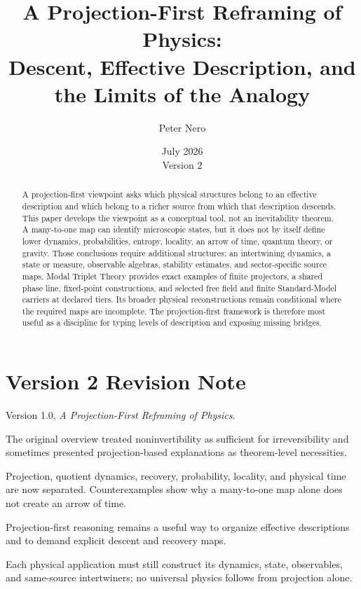 \documentclass[11pt]{article}
\title{A Projection-First Reframing of Physics:\\
\large Descent, Effective Description, and the Limits of the Analogy}
\author{Peter Nero}
\date{July 2026\\Version 2}
\begin{document}
\maketitle

\begin{abstract}
A projection-first viewpoint asks which physical structures belong to an
effective description and which belong to a richer source from which that
description descends. This paper develops the viewpoint as a conceptual
tool, not an inevitability theorem. A many-to-one map can identify
microscopic states, but it does not by itself define lower dynamics,
probabilities, entropy, locality, an arrow of time, quantum theory, or
gravity. Those conclusions require additional structures: an intertwining
dynamics, a state or measure, observable algebras, stability estimates, and
sector-specific source maps. Modal Triplet Theory provides exact examples of
finite projectors, a shared phase line, fixed-point constructions, and
selected free field and finite Standard-Model carriers at declared tiers.
Its broader physical reconstructions remain conditional where the required
maps are incomplete. The projection-first framework is therefore most
useful as a discipline for typing levels of description and exposing missing
bridges.
\end{abstract}

\section*{Version 2 Revision Note}
\begin{description}[leftmargin=3.2cm,style=nextline]
\item[Supersedes] Version 1.0, \emph{A Projection-First Reframing of
Physics}.
\item[Reason] The original overview treated noninvertibility as sufficient
for irreversibility and sometimes presented projection-based explanations
as theorem-level necessities.
\item[Resolution] Projection, quotient dynamics, recovery, probability,
locality, and physical time are now separated. Counterexamples show why a
many-to-one map alone does not create an arrow of time.
\item[Retained result] Projection-first reasoning remains a useful way to
organize effective descriptions and to demand explicit descent and recovery
maps.
\item[Remaining boundary] Each physical application must still construct
its dynamics, state, observables, and same-source intertwiners; no universal
physics follows from projection alone.
\end{description}
\end{document}
